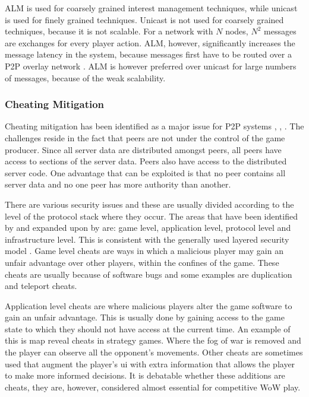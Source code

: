 \documentclass[journal,oneside,a4paper,onecolumn]{IEEEtran}
\begin{document}
ALM is used for coarsely grained interest management techniques, while unicast is used for finely grained techniques. Unicast is not used for coarsely grained techniques, because it is not scalable. For a network with $N$ nodes, $N^2$ messages are exchanges for every player action. ALM, however, significantly increases the message latency in the system, because messages first have to be routed over a P2P overlay network \cite{}. ALM is however preferred over unicast for large numbers of messages, because of the weak scalability.

\subsubsection{Cheating Mitigation}
\label{key_challenges_cheating}

Cheating mitigation has been identified as a major issue for P2P systems \cite{knutsson_p2p_first}, \cite{challenges_p2p_gaming}, \cite{cheat_proof_event_ordering}. The challenges reside in the fact that peers are not under the control of the game producer. Since all server data are distributed amongst peers, all peers have access to sections of the server data. Peers also have access to the distributed server code. One advantage that can be exploited is that no peer contains all server data and no one peer has more authority than another.

There are various security issues and these are usually divided according to the level of the protocol stack where they occur. The areas that have been identified by \cite{cheat_proof_event_ordering} and expanded upon by \cite{cheating_taxonomy} are: game level, application level, protocol level and infrastructure level. This is consistent with the generally used layered security model \cite{distributed_systems_security}. Game level cheats are ways in which a malicious player may gain an unfair advantage over other players, within the confines of the game. These cheats are usually because of software bugs and some examples are duplication and teleport cheats.

Application level cheats are where malicious players alter the game software to gain an unfair advantage. This is usually done by gaining access to the game state to which they should not have access at the current time. An example of this is map reveal cheats in strategy games. Where the fog of war is removed and the player can observe all the opponent's movements. Other cheats are sometimes used that augment the player's \ac{ui} with extra information that allows the player to make more informed decisions. It is debatable whether these additions are cheats, they are, however, considered almost essential for competitive \ac{WoW} play.
\end{document}
